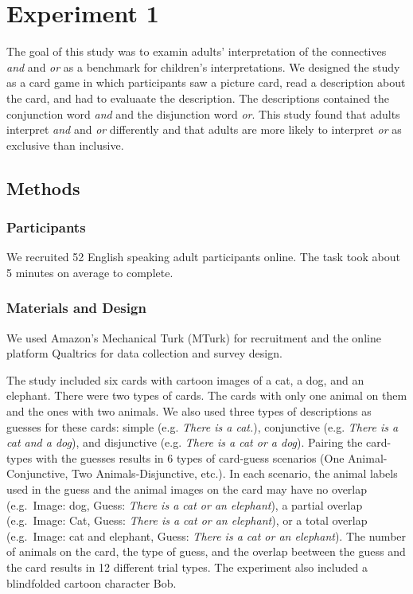 \documentclass[10pt, letterpaper]{article}
\begin{document}
\section{Experiment 1}\label{experiment-1}

The goal of this study was to examin adults' interpretation of the
connectives \emph{and} and \emph{or} as a benchmark for children's
interpretations. We designed the study as a card game in which
participants saw a picture card, read a description about the card, and
had to evaluaate the description. The descriptions contained the
conjunction word \emph{and} and the disjunction word \emph{or}. This
study found that adults interpret \emph{and} and \emph{or} differently
and that adults are more likely to interpret \emph{or} as exclusive than
inclusive.

\subsection{Methods}\label{methods}

\subsubsection{Participants}\label{participants}

We recruited 52 English speaking adult participants online. The task
took about 5 minutes on average to complete.

\subsubsection{Materials and Design}\label{materials-and-design}

We used Amazon's Mechanical Turk (MTurk) for recruitment and the online
platform Qualtrics for data collection and survey design.

The study included six cards with cartoon images of a cat, a dog, and an
elephant. There were two types of cards. The cards with only one animal
on them and the ones with two animals. We also used three types of
descriptions as guesses for these cards: simple (e.g. \emph{There is a
cat.}), conjunctive (e.g. \emph{There is a cat and a dog}), and
disjunctive (e.g. \emph{There is a cat or a dog}). Pairing the
card-types with the guesses results in 6 types of card-guess scenarios
(One Animal-Conjunctive, Two Animals-Disjunctive, etc.). In each
scenario, the animal labels used in the guess and the animal images on
the card may have no overlap (e.g.~Image: dog, Guess: \emph{There is a
cat or an elephant}), a partial overlap (e.g.~Image: Cat, Guess:
\emph{There is a cat or an elephant}), or a total overlap (e.g.~Image:
cat and elephant, Guess: \emph{There is a cat or an elephant}). The
number of animals on the card, the type of guess, and the overlap
beetween the guess and the card results in 12 different trial types. The
experiment also included a blindfolded cartoon character Bob.
\end{document}
